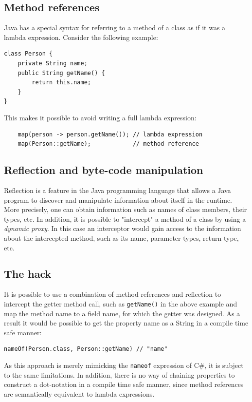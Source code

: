 \subsection{Method references}
Java has a special syntax for referring to a method of a class as if it was a lambda expression. Consider the following example: 

\begin{verbatim}
class Person {
    private String name;
    public String getName() {
        return this.name;
    }
}
\end{verbatim}

This makes it possible to avoid writing a full lambda expression:
\begin{verbatim}
    map(person -> person.getName()); // lambda expression
    map(Person::getName);            // method reference
\end{verbatim}

\subsection{Reflection and byte-code manipulation}
Reflection is a feature in the Java programming language that allows a Java program to discover and manipulate information about itself in the runtime. More precisely, one can obtain information such as names of class members, their types, etc. In addition, it is possible to "intercept" a method of a class by using a \textit{dynamic proxy}. In this case an interceptor would gain access to the information about the intercepted method, such as its name, parameter types, return type, etc.

\subsection{The hack}
It is possible to use a combination of method references and reflection to intercept the getter method call, such as \texttt{getName()} in the above example and map the method name to a field name, for which the getter was designed. As a result it would be possible to get the property name as a String in a compile time safe manner:

\begin{verbatim}
nameOf(Person.class, Person::getName) // "name"
\end{verbatim}

As this approach is merely mimicking the \texttt{nameof} expression of C\#, it is subject to the same limitations. In addition, there is no way of chaining properties to construct a dot-notation in a compile time safe manner, since method references are semantically equivalent to lambda expressions.

